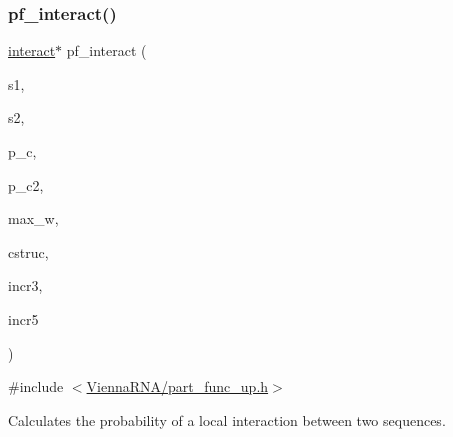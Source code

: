 \subsubsection{\texorpdfstring{pf\+\_\+interact()}{pf\_interact()}}
{\footnotesize\ttfamily \mbox{\hyperlink{group__data__structures_structinteract}{interact}}$\ast$ pf\+\_\+interact (\begin{DoxyParamCaption}\item[{const char $\ast$}]{s1,  }\item[{const char $\ast$}]{s2,  }\item[{\mbox{\hyperlink{group__data__structures_structpu__contrib}{pu\+\_\+contrib}} $\ast$}]{p\+\_\+c,  }\item[{\mbox{\hyperlink{group__data__structures_structpu__contrib}{pu\+\_\+contrib}} $\ast$}]{p\+\_\+c2,  }\item[{int}]{max\+\_\+w,  }\item[{char $\ast$}]{cstruc,  }\item[{int}]{incr3,  }\item[{int}]{incr5 }\end{DoxyParamCaption})}



{\ttfamily \#include $<$\mbox{\hyperlink{part__func__up_8h}{Vienna\+R\+N\+A/part\+\_\+func\+\_\+up.\+h}}$>$}



Calculates the probability of a local interaction between two sequences. 

